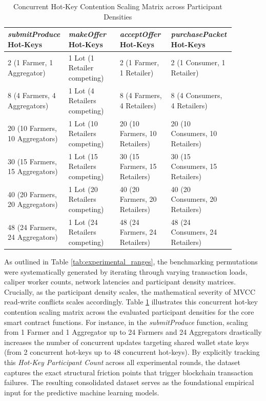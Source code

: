 \documentclass[12pt]{article}
\begin{document}
\begin{table}[H]
\centering
\caption{Concurrent Hot-Key Contention Scaling Matrix across Participant Densities}
\label{tab:hotkey_scaling}
\begin{tabular}{|p{0.22\linewidth}|p{0.22\linewidth}|p{0.22\linewidth}|p{0.22\linewidth}|}
\hline
\textbf{\textit{submitProduce} Hot-Keys} & \textbf{\textit{makeOffer} Hot-Keys} & \textbf{\textit{acceptOffer} Hot-Keys} & \textbf{\textit{purchasePacket} Hot-Keys} \\
\hline
2 (1 Farmer, 1 Aggregator) & 1 Lot (1 Retailer competing) & 2 (1 Farmer, 1 Retailer) & 2 (1 Consumer, 1 Retailer) \\ \hline
8 (4 Farmers, 4 Aggregators) & 1 Lot (4 Retailers competing) & 8 (4 Farmers, 4 Retailers) & 8 (4 Consumers, 4 Retailers) \\ \hline
20 (10 Farmers, 10 Aggregators) & 1 Lot (10 Retailers competing) & 20 (10 Farmers, 10 Retailers) & 20 (10 Consumers, 10 Retailers) \\ \hline
30 (15 Farmers, 15 Aggregators) & 1 Lot (15 Retailers competing) & 30 (15 Farmers, 15 Retailers) & 30 (15 Consumers, 15 Retailers) \\ \hline
40 (20 Farmers, 20 Aggregators) & 1 Lot (20 Retailers competing) & 40 (20 Farmers, 20 Retailers) & 40 (20 Consumers, 20 Retailers) \\ \hline
48 (24 Farmers, 24 Aggregators)& 1 Lot (24 Retailers competing) & 48 (24 Farmers, 24 Retailers) & 48 (24 Consumers, 24 Retailers) \\
\hline
\end{tabular}
\end{table}

As outlined in Table \ref{tab:experimental_ranges}, the benchmarking permutations were systematically generated by iterating through varying transaction loads, caliper worker counts, network latencies and participant density matrices. Crucially, as the participant density scales, the mathematical severity of MVCC read-write conflicts scales accordingly. Table \ref{tab:hotkey_scaling} illustrates this concurrent hot-key contention scaling matrix across the evaluated participant densities for the core smart contract functions. For instance, in the \textit{submitProduce} function, scaling from 1 Farmer and 1 Aggregator up to 24 Farmers and 24 Aggregators drastically increases the number of concurrent updates targeting shared wallet state keys (from 2 concurrent hot-keys up to 48 concurrent hot-keys). By explicitly tracking this \textit{Hot-Key Participant Count} across all experimental rounds, the dataset captures the exact structural friction points that trigger blockchain transaction failures. The resulting consolidated dataset serves as the foundational empirical input for the predictive machine learning models.
\end{document}
